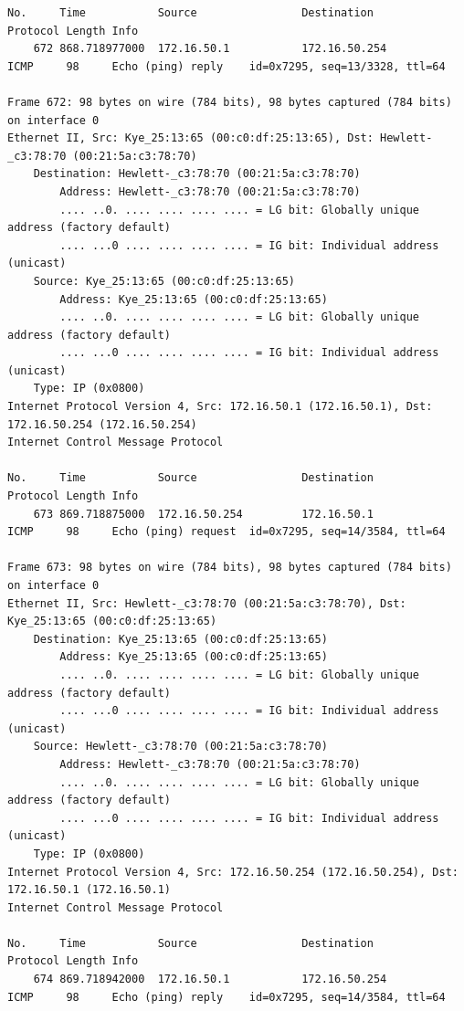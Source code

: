 \documentclass[a4paper,11pt]{article}
\begin{document}
\begin{lstlisting}
No.     Time           Source                Destination           Protocol Length Info
    672 868.718977000  172.16.50.1           172.16.50.254         ICMP     98     Echo (ping) reply    id=0x7295, seq=13/3328, ttl=64

Frame 672: 98 bytes on wire (784 bits), 98 bytes captured (784 bits) on interface 0
Ethernet II, Src: Kye_25:13:65 (00:c0:df:25:13:65), Dst: Hewlett-_c3:78:70 (00:21:5a:c3:78:70)
    Destination: Hewlett-_c3:78:70 (00:21:5a:c3:78:70)
        Address: Hewlett-_c3:78:70 (00:21:5a:c3:78:70)
        .... ..0. .... .... .... .... = LG bit: Globally unique address (factory default)
        .... ...0 .... .... .... .... = IG bit: Individual address (unicast)
    Source: Kye_25:13:65 (00:c0:df:25:13:65)
        Address: Kye_25:13:65 (00:c0:df:25:13:65)
        .... ..0. .... .... .... .... = LG bit: Globally unique address (factory default)
        .... ...0 .... .... .... .... = IG bit: Individual address (unicast)
    Type: IP (0x0800)
Internet Protocol Version 4, Src: 172.16.50.1 (172.16.50.1), Dst: 172.16.50.254 (172.16.50.254)
Internet Control Message Protocol

No.     Time           Source                Destination           Protocol Length Info
    673 869.718875000  172.16.50.254         172.16.50.1           ICMP     98     Echo (ping) request  id=0x7295, seq=14/3584, ttl=64

Frame 673: 98 bytes on wire (784 bits), 98 bytes captured (784 bits) on interface 0
Ethernet II, Src: Hewlett-_c3:78:70 (00:21:5a:c3:78:70), Dst: Kye_25:13:65 (00:c0:df:25:13:65)
    Destination: Kye_25:13:65 (00:c0:df:25:13:65)
        Address: Kye_25:13:65 (00:c0:df:25:13:65)
        .... ..0. .... .... .... .... = LG bit: Globally unique address (factory default)
        .... ...0 .... .... .... .... = IG bit: Individual address (unicast)
    Source: Hewlett-_c3:78:70 (00:21:5a:c3:78:70)
        Address: Hewlett-_c3:78:70 (00:21:5a:c3:78:70)
        .... ..0. .... .... .... .... = LG bit: Globally unique address (factory default)
        .... ...0 .... .... .... .... = IG bit: Individual address (unicast)
    Type: IP (0x0800)
Internet Protocol Version 4, Src: 172.16.50.254 (172.16.50.254), Dst: 172.16.50.1 (172.16.50.1)
Internet Control Message Protocol

No.     Time           Source                Destination           Protocol Length Info
    674 869.718942000  172.16.50.1           172.16.50.254         ICMP     98     Echo (ping) reply    id=0x7295, seq=14/3584, ttl=64


\end{lstlisting}
\end{document}
